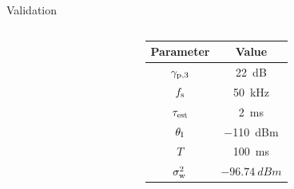 \documentclass[16pt]{beamer}
\newcommand{\fs}[2]{\fontsize{#1 pt}{#2}\selectfont}
\begin{document}
\begin{frame}[c]{Validation}
\begin{columns}
\begin{column}{0.45\columnwidth}
		\end{column}
		\begin{column}{0.55\columnwidth}
		\fs{7}{8}
		\begin{overlayarea}{\textwidth}{3.1cm}
			\vspace{2mm}	
		\begin{center}
		\centering
		\renewcommand{\arraystretch}{1.3}
		\begin{tabular}{c||c}
                	\rowcolor{kit-green30}
			Parameter & Value \\ \hline \hline
                	${\gamma}_{\text{p,3}}$ & \SI{22}{dB} \\
                	$f_{\text{s}}$ & \SI{50}{kHz}\\
                	$\tau_{\text{est}}$ & \SI{2}{ms}\\
                	$\theta_{\text{I}}$ & \SI{-110}{dBm}\\
                	$T$ & \SI{100}{ms}\\
                	$\sigma^2_{\text{w}}$ & $\SI{-96.74}{dBm}$\\ \hline
        	\end{tabular}
		\end{center}
		\end{overlayarea}
\end{column}
\end{columns}
\end{frame}
\end{document}
